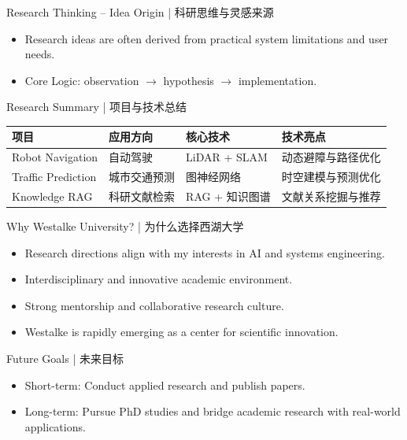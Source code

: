 \documentclass[11pt]{beamer}
\begin{document}
\begin{frame}{Research Thinking – Idea Origin | 科研思维与灵感来源}
  \begin{itemize}
    \item Research ideas are often derived from practical system limitations and user needs.
    \item Core Logic: observation $\rightarrow$ hypothesis $\rightarrow$ implementation.
  \end{itemize}
  \end{frame}



\begin{frame}{Research Summary | 项目与技术总结}
\renewcommand{\arraystretch}{1.4}
\begin{tabular}{p{2cm} p{2cm} p{2.5cm} p{4cm}}
\toprule
项目 & 应用方向 & 核心技术 & 技术亮点 \\
\midrule
Robot Navigation & 自动驾驶 & LiDAR + SLAM & 动态避障与路径优化 \\
Traffic Prediction & 城市交通预测 & 图神经网络 & 时空建模与预测优化 \\
Knowledge RAG & 科研文献检索 & RAG + 知识图谱 & 文献关系挖掘与推荐 \\
\bottomrule
\end{tabular}
\end{frame}

\begin{frame}{Why Westalke University? | 为什么选择西湖大学}
\begin{itemize}
  \item Research directions align with my interests in AI and systems engineering.
  \item Interdisciplinary and innovative academic environment.
  \item Strong mentorship and collaborative research culture.
  \item Westalke is rapidly emerging as a center for scientific innovation.
\end{itemize}
\end{frame}

\begin{frame}{Future Goals | 未来目标}
\begin{itemize}
  \item Short-term: Conduct applied research and publish papers.
  \item Long-term: Pursue PhD studies and bridge academic research with real-world applications.
\end{itemize}
\end{frame}
\end{document}
